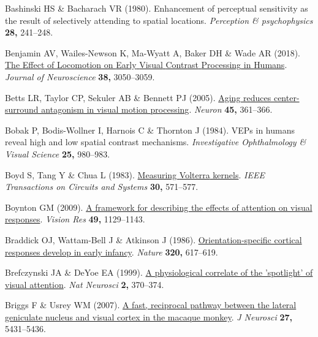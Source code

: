 \documentclass[
  letterpaper,
  DIV=11,
  numbers=noendperiod]{scrartcl}
\newlength{\cslhangindent}
\newenvironment{CSLReferences}[2] %
 {\begin{list}{}{%
  \setlength{\itemindent}{0pt}
  \setlength{\leftmargin}{0pt}
  \setlength{\parsep}{0pt}
  \ifodd #1
   \setlength{\leftmargin}{\cslhangindent}
   \setlength{\itemindent}{-1\cslhangindent}
  \fi
  \setlength{\itemsep}{#2\baselineskip}}}
 {\end{list}}
\begin{document}
\begin{CSLReferences}{1}{1}
Bashinski HS \& Bacharach VR (1980). Enhancement of perceptual
sensitivity as the result of selectively attending to spatial locations.
\emph{Perception \& psychophysics} \textbf{28,} 241--248.

Benjamin AV, Wailes-Newson K, Ma-Wyatt A, Baker DH \& Wade AR (2018).
\href{https://doi.org/10.1523/JNEUROSCI.1428-17.2017}{The {Effect} of
{Locomotion} on {Early} {Visual} {Contrast} {Processing} in {Humans}}.
\emph{Journal of Neuroscience} \textbf{38,} 3050--3059.

Betts LR, Taylor CP, Sekuler AB \& Bennett PJ (2005).
\href{https://doi.org/10.1016/j.neuron.2004.12.041}{Aging reduces
center-surround antagonism in visual motion processing}. \emph{Neuron}
\textbf{45,} 361--366.

Bobak P, Bodis-Wollner I, Harnois C \& Thornton J (1984). VEPs in humans
reveal high and low spatial contrast mechanisms. \emph{Investigative
Ophthalmology \& Visual Science} \textbf{25,} 980--983.

Boyd S, Tang Y \& Chua L (1983).
\href{https://doi.org/10.1109/TCS.1983.1085391}{Measuring {Volterra}
kernels}. \emph{IEEE Transactions on Circuits and Systems} \textbf{30,}
571--577.

Boynton GM (2009). \href{https://doi.org/10.1016/j.visres.2008.11.001}{A
framework for describing the effects of attention on visual responses}.
\emph{Vision Res} \textbf{49,} 1129--1143.

Braddick OJ, Wattam-Bell J \& Atkinson J (1986).
\href{https://doi.org/10.1038/320617a0}{Orientation-specific cortical
responses develop in early infancy}. \emph{Nature} \textbf{320,}
617--619.

Brefczynski JA \& DeYoe EA (1999). \href{https://doi.org/10.1038/7280}{A
physiological correlate of the 'spotlight' of visual attention}.
\emph{Nat Neurosci} \textbf{2,} 370--374.

Briggs F \& Usrey WM (2007).
\href{https://doi.org/10.1523/JNEUROSCI.1035-07.2007}{A fast, reciprocal
pathway between the lateral geniculate nucleus and visual cortex in the
macaque monkey}. \emph{J Neurosci} \textbf{27,} 5431--5436.


\end{CSLReferences}
\end{document}

